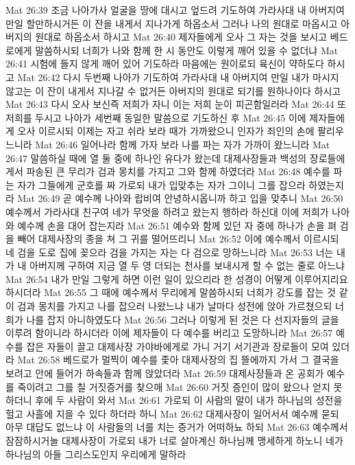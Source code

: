 Mat 26:39  조금 나아가사 얼굴을 땅에 대시고 엎드려 기도하여 가라사대 내 아버지여 만일 할만하시거든 이 잔을 내게서 지나가게 하옵소서 그러나 나의 원대로 마옵시고 아버지의 원대로 하옵소서 하시고
Mat 26:40  제자들에게 오사 그 자는 것을 보시고 베드로에게 말씀하시되 너희가 나와 함께 한 시 동안도 이렇게 깨어 있을 수 없더냐
Mat 26:41  시험에 들지 않게 깨어 있어 기도하라 마음에는 원이로되 육신이 약하도다 하시고
Mat 26:42  다시 두번째 나아가 기도하여 가라사대 내 아버지여 만일 내가 마시지 않고는 이 잔이 내게서 지나갈 수 없거든 아버지의 원대로 되기를 원하나이다 하시고
Mat 26:43  다시 오사 보신즉 저희가 자니 이는 저희 눈이 피곤함일러라
Mat 26:44  또 저희를 두시고 나아가 세번째 동일한 말씀으로 기도하신 후
Mat 26:45  이에 제자들에게 오사 이르시되 이제는 자고 쉬라 보라 때가 가까왔으니 인자가 죄인의 손에 팔리우느니라
Mat 26:46  일어나라 함께 가자 보라 나를 파는 자가 가까이 왔느니라
Mat 26:47  말씀하실 때에 열 둘 중에 하나인 유다가 왔는데 대제사장들과 백성의 장로들에게서 파송된 큰 무리가 검과 몽치를 가지고 그와 함께 하였더라
Mat 26:48  예수를 파는 자가 그들에게 군호를 짜 가로되 내가 입맞추는 자가 그이니 그를 잡으라 하였는지라
Mat 26:49  곧 예수께 나아와 랍비여 안녕하시옵니까 하고 입을 맞추니
Mat 26:50  예수께서 가라사대 친구여 네가 무엇을 하려고 왔는지 행하라 하신대 이에 저희가 나아와 예수께 손을 대어 잡는지라
Mat 26:51  예수와 함께 있던 자 중에 하나가 손을 펴 검을 빼어 대제사장의 종을 쳐 그 귀를 떨어뜨리니
Mat 26:52  이에 예수께서 이르시되 네 검을 도로 집에 꽂으라 검을 가지는 자는 다 검으로 망하느니라
Mat 26:53  너는 내가 내 아버지께 구하여 지금 열 두 영 더되는 천사를 보내시게 할 수 없는 줄로 아느냐
Mat 26:54  내가 만일 그렇게 하면 이런 일이 있으리라 한 성경이 어떻게 이루어지리요 하시더라
Mat 26:55  그 때에 예수께서 무리에게 말씀하시되 너희가 강도를 잡는 것 같이 검과 몽치를 가지고 나를 잡으러 나왔느냐 내가 날마다 성전에 앉아 가르쳤으되 너희가 나를 잡지 아니하였도다
Mat 26:56  그러나 이렇게 된 것은 다 선지자들의 글을 이루려 함이니라 하시더라 이에 제자들이 다 예수를 버리고 도망하니라
Mat 26:57  예수를 잡은 자들이 끌고 대제사장 가야바에게로 가니 거기 서기관과 장로들이 모여 있더라
Mat 26:58  베드로가 멀찍이 예수를 좇아 대제사장의 집 뜰에까지 가서 그 결국을 보려고 안에 들어가 하속들과 함께 앉았더라
Mat 26:59  대제사장들과 온 공회가 예수를 죽이려고 그를 칠 거짓증거를 찾으매
Mat 26:60  거짓 증인이 많이 왔으나 얻지 못하더니 후에 두 사람이 와서
Mat 26:61  가로되 이 사람의 말이 내가 하나님의 성전을 헐고 사흘에 지을 수 있다 하더라 하니
Mat 26:62  대제사장이 일어서서 예수께 묻되 아무 대답도 없느냐 이 사람들의 너를 치는 증거가 어떠하뇨 하되
Mat 26:63  예수께서 잠잠하시거늘 대제사장이 가로되 내가 너로 살아계신 하나님께 맹세하게 하노니 네가 하나님의 아들 그리스도인지 우리에게 말하라
